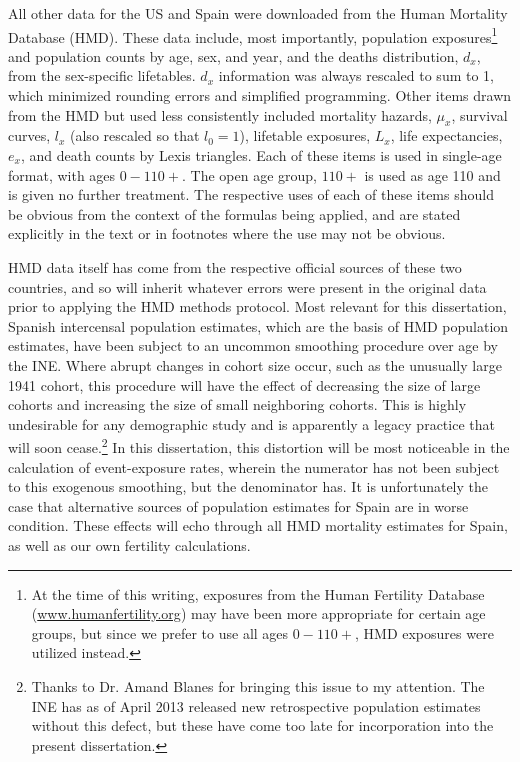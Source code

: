 All other data for the US and Spain were downloaded from the Human Mortality
Database (HMD)\citep{wilmoth2007methods}. These data include, most importantly,
population exposures\footnote{At the time of this writing, exposures from the
Human Fertility Database (\url{www.humanfertility.org}) may have been more
appropriate for certain age groups, but since we prefer to use all ages
$0-110+$, HMD exposures were utilized instead.} and population counts by age,
sex, and year, and the deaths distribution, $d_x$, from the sex-specific
lifetables. $d_x$ information was always rescaled to sum to 1, which minimized rounding errors and simplified
programming. Other items drawn from the HMD but used less consistently
included mortality hazards, $\mu_x$, survival curves, $l_x$ (also rescaled so that $l_0 = 1$), 
lifetable exposures, $L_x$,
life expectancies, $e_x$, and death counts by Lexis triangles. Each of these
items is used in single-age format, with ages $0-110+$. The open age group,
$110+$ is used as age 110 and is given no further treatment. The
respective uses of each of these items should be obvious from the context 
of the formulas being applied, and are stated explicitly in the text or in 
footnotes where the use may not be obvious.

HMD data itself has come from the respective official sources of these
two countries, and so will inherit whatever errors were present in the original
data prior to applying the HMD methods protocol. Most relevant for this
dissertation, Spanish intercensal population estimates, which are the basis of
HMD population estimates, have been subject to an uncommon smoothing
procedure over age by the INE. Where abrupt changes in cohort size occur, such
as the unusually large 1941 cohort, this procedure will have the effect of
decreasing the size of large cohorts and increasing the size of small neighboring cohorts. This is
highly undesirable for any demographic study and is apparently a legacy
practice that will soon cease.\footnote{Thanks to Dr. Amand Blanes for bringing
this issue to my attention. The INE has as of April 2013 released new
retrospective population estimates without this defect, but these have come too
late for incorporation into the present dissertation.} In this dissertation, this
distortion will be most noticeable in the calculation of event-exposure rates, 
wherein the numerator has not been subject to this exogenous smoothing, but 
the denominator has. It is unfortunately the case that alternative sources of 
population estimates for Spain are in worse condition. These effects will echo through all HMD mortality
estimates for Spain, as well as our own fertility calculations. 

